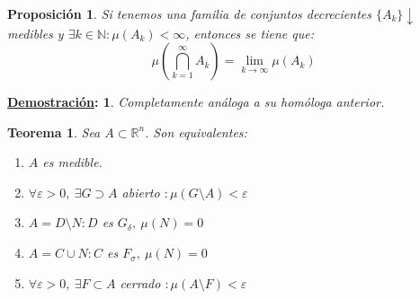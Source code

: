 \documentclass[10pt,a4paper,openright]{book}
\theoremstyle{break}
\newtheorem*{theo}{Teorema}
\newtheorem*{prop}{Proposición}
\newtheorem*{demo}{\underline{Demostración}:}
\begin{document}
\begin{prop}
Si tenemos una familia de conjuntos decrecientes $\{A_k\}\downarrow$ medibles y $\exists k \in \mathbb N : \mu(A_k) < \infty$, entonces se tiene que:
$$\mu\left(\bigcap_{k=1}^\infty A_k\right) = \lim_{k\rightarrow \infty} \mu(A_k)$$
\end{prop}
\begin{demo}
Completamente análoga a su homóloga anterior.
\end{demo}

\begin{theo}
Sea $A \subset \mathbb{R}^n$. Son equivalentes:  
\begin{enumerate}
\item $A$ es medible.
\item $\forall \varepsilon > 0,\ \exists G \supset A$ abierto $: \mu\left( G\setminus A  \right) < \varepsilon$  
\item $A = D \setminus N: D$ es $G_{\delta},\ \mu\left( N \right) = 0$  
\item $A = C \cup N: C$ es $F_{\sigma},\ \mu\left( N \right) = 0$  
\item $\forall \varepsilon > 0,\ \exists F \subset A$ cerrado $: \mu\left( A \setminus F \right) < \varepsilon$  
\end{enumerate}
\end{theo}
\end{document}
